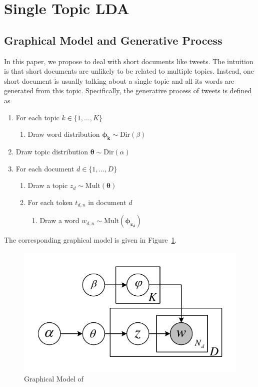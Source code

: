 \section{Single Topic LDA}
\label{sec:model}

\subsection{Graphical Model and Generative Process}

In this paper, we propose \stlda to deal with short documents like tweets. The intuition is that short documents are unlikely to be related to multiple topics. Instead, one short document is usually talking about a single topic and all its words are generated from this topic. Specifically, the generative process of tweets is defined as

\begin{enumerate}
\item For each topic $k \in \{1, \ldots, K\}$
    \begin{enumerate}
    \item Draw word distribution $\bm{\phi_k} \sim \mathrm{Dir}(\beta)$
    \end{enumerate}
\item Draw topic distribution $\bm{\theta} \sim \mathrm{Dir}(\alpha)$
\item For each document $d \in \{1, \ldots, D\}$
    \begin{enumerate}
    \item Draw a topic $z_d \sim \mathrm{Mult}(\bm{\theta})$
    \item For each token $t_{d,n}$ in document $d$
        \begin{enumerate}
        \item Draw a word $w_{d,n} \sim \mathrm{Mult}(\bm{\phi_{z_d}})$
        \end{enumerate}
    \end{enumerate}
\end{enumerate}

The corresponding graphical model is given in Figure~\ref{fig:stlda}.

\begin{figure}[h]
\centering
\includegraphics[width=.8\linewidth]{figures/single.pdf}
\caption{Graphical Model of \stlda}\label{fig:stlda}
\end{figure}

